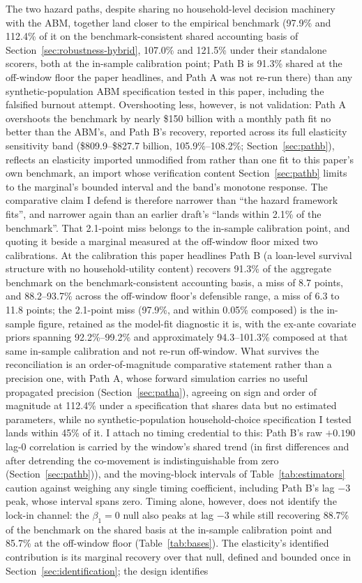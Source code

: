 \documentclass[12pt]{article}
\begin{document}
The two hazard paths, despite sharing no household-level decision machinery with the ABM, together land closer to the empirical benchmark (97.9\% and 112.4\% of it on the benchmark-consistent shared accounting basis of Section~\ref{sec:robustness-hybrid}, 107.0\% and 121.5\% under their standalone scorers, both at the in-sample calibration point; Path B is 91.3\% shared at the off-window floor the paper headlines, and Path A was not re-run there) than any synthetic-population ABM specification tested in this paper, including the falsified burnout attempt. Overshooting less, however, is not validation: Path A overshoots the benchmark by nearly \$150 billion with a monthly path fit no better than the ABM's, and Path B's recovery, reported across its full elasticity sensitivity band (\$809.9--\$827.7 billion, 105.9\%--108.2\%; Section~\ref{sec:pathb}), reflects an elasticity imported unmodified from \citet{liebersohn2024} rather than one fit to this paper's own benchmark, an import whose verification content Section~\ref{sec:pathb} limits to the marginal's bounded interval and the band's monotone response. The comparative claim I defend is therefore narrower than ``the hazard framework fits'', and narrower again than an earlier draft's ``lands within 2.1\% of the benchmark''. That 2.1-point miss belongs to the in-sample calibration point, and quoting it beside a marginal measured at the off-window floor mixed two calibrations. At the calibration this paper headlines Path B (a loan-level survival structure with no household-utility content) recovers 91.3\% of the aggregate benchmark on the benchmark-consistent accounting basis, a miss of 8.7 points, and 88.2--93.7\% across the off-window floor's defensible range, a miss of 6.3 to 11.8 points; the 2.1-point miss (97.9\%, and within 0.05\% composed) is the in-sample figure, retained as the model-fit diagnostic it is, with the ex-ante covariate priors spanning 92.2\%--99.2\% and approximately 94.3--101.3\% composed at that same in-sample calibration and not re-run off-window. What survives the reconciliation is an order-of-magnitude comparative statement rather than a precision one, with Path A, whose forward simulation carries no useful propagated precision (Section~\ref{sec:patha}), agreeing on sign and order of magnitude at 112.4\% under a specification that shares data but no estimated parameters, while no synthetic-population household-choice specification I tested lands within 45\% of it. I attach no timing credential to this: Path B's raw $+0.190$ lag-0 correlation is carried by the window's shared trend (in first differences and after detrending the co-movement is indistinguishable from zero (Section~\ref{sec:pathb})), and the moving-block intervals of Table~\ref{tab:estimators} caution against weighing any single timing coefficient, including Path B's lag $-3$ peak, whose interval spans zero. Timing alone, however, does not identify the lock-in channel: the $\beta_1 = 0$ null also peaks at lag $-3$ while still recovering 88.7\% of the benchmark on the shared basis at the in-sample calibration point and 85.7\% at the off-window floor (Table~\ref{tab:bases}). The elasticity's identified contribution is its marginal recovery over that null, defined and bounded once in Section~\ref{sec:identification}; the design identifies 
\end{document}
